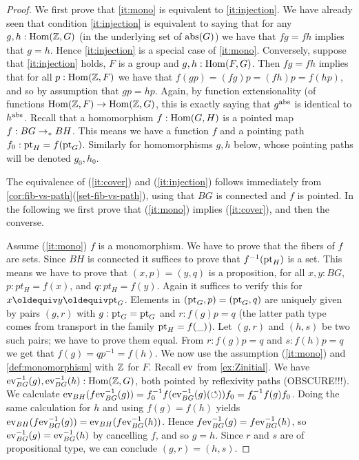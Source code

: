 \begin{proof}
  {\color{blue}We first prove that \cref{it:mono} is equivalent to \cref{it:injection}.
    We have already seen that condition \cref{it:injection} is equivalent to saying that for any $g,h:\mathrm{Hom}(\mathbb{Z},G)$ (\ie in the underlying set of $\mathrm{abs}(G)$) we have that $fg=fh$ implies that $g=h$.  Hence \cref{it:injection} is a special case of \cref{it:mono}.  Conversely, suppose that \cref{it:injection} holds, $F$ is a group and $g,h:\mathrm{Hom}(F,G)$.  Then $fg=fh$ implies that for all $p:\mathrm{Hom}(\mathbb{Z},F)$ we have that $f(gp)=(fg)p=(fh)p=f(hp)$, and so by assumption that $gp=hp$.  Again, by function extensionality (of functions $\mathrm{Hom}(\mathbb{Z},F)\to\mathrm{Hom}(\mathbb{Z},G)$, this is exactly saying that $g^{\mathrm{abs}}$ is identical to $h^{\mathrm{abs}}$.}
Recall that a homomorphism $f: \mathrm{Hom}(G,H)$ is a pointed map $f: BG\to_\ast BH$.
This means we have a function $f$ and a pointing path $f_0 : \mathrm{pt}_H = f(\mathrm{pt}_G)$. 
Similarly for homomorphisms $g,h$ below, whose pointing paths will be denoted $g_0,h_0$.

The equivalence of (\ref{it:cover}) and (\ref{it:injection}) follows
immediately from \cref{cor:fib-vs-path}(\ref{set-fib-vs-path}), using
that $BG$ is connected and $f$ is pointed.
In the following we first prove that (\ref{it:mono}) implies (\ref{it:cover}),
and then the converse.

Assume (\ref{it:mono}) $f$ is a monomorphism. 
We have to prove that the fibers of $f$ are sets.
Since $BH$ is connected it suffices to prove that $f^{-1}(\mathrm{pt}_H)$ is a set. 
This means we have to prove that $(x,p) = (y,q)$ is a proposition,
for all $x,y:BG$, $p: pt_H = f(x)$, and $q: pt_H = f(y)$.
Again it suffices to verify this for $x\jdeq y\jdeq\pt_G$.
Elements in $(\mathrm{pt}_G,p) = (\mathrm{pt}_G,q)$ are uniquely given by pairs $(g,r)$
with $g: \mathrm{pt}_G = \mathrm{pt}_G$ and $r : f(g)p = q$
(the latter path type comes from transport in the family $\mathrm{pt}_H = f(\_)$).
Let $(g,r)$ and $(h,s)$ be two such pairs; we have to prove them equal. 
From $r : f(g)p = q$ and $s : f(h)p = q$ we get that $f(g)=qp^{-1}=f(h)$.
We now use the assumption (\ref{it:mono}) and
\cref{def:monomorphism} with $\mathbb{Z}$ for $F$.
Recall $\mathrm{ev}$ from \cref{ex:Zinitial}. 
We have $\mathrm{ev}_{BG}^{-1}(g),\mathrm{ev}_{BG}^{-1}(h) : \mathrm{Hom}(\mathbb{Z},G)$,
both pointed by reflexivity paths (OBSCURE!!!). We calculate
$\mathrm{ev}_{BH}(f\mathrm{ev}_{BG}^{-1}(g)) = f_0^{-1} f(\mathrm{ev}_{BG}^{-1}(g)(\circlearrowleft)) f_0 = f_0^{-1} f(g) f_0$.
Doing the same calculation for $h$ and using $f(g)=f(h)$ yields
$\mathrm{ev}_{BH}(f\mathrm{ev}_{BG}^{-1}(g)) = \mathrm{ev}_{BH}(f\mathrm{ev}_{BG}^{-1}(h))$.
Hence $f\mathrm{ev}_{BG}^{-1}(g) = f\mathrm{ev}_{BG}^{-1}(h)$, so
$\mathrm{ev}_{BG}^{-1}(g) = \mathrm{ev}_{BG}^{-1}(h)$ by cancelling $f$, and so $g=h$. 
Since $r$ and $s$ are of propositional type, we can conclude $(g,r) = (h,s)$.


\end{proof}
